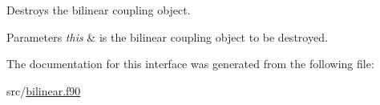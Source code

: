 Destroys the bilinear coupling object. 


\begin{DoxyParams}{Parameters}
{\em this} & is the bilinear coupling object to be destroyed. \\
\hline
\end{DoxyParams}


The documentation for this interface was generated from the following file\+:\begin{DoxyCompactItemize}
\item 
src/\hyperlink{bilinear_8f90}{bilinear.\+f90}\end{DoxyCompactItemize}
